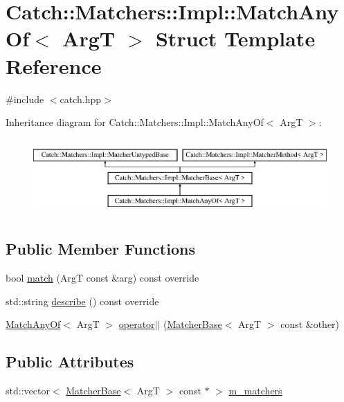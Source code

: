 \hypertarget{struct_catch_1_1_matchers_1_1_impl_1_1_match_any_of}{}\section{Catch\+:\+:Matchers\+:\+:Impl\+:\+:Match\+Any\+Of$<$ ArgT $>$ Struct Template Reference}
\label{struct_catch_1_1_matchers_1_1_impl_1_1_match_any_of}


{\ttfamily \#include $<$catch.\+hpp$>$}

Inheritance diagram for Catch\+:\+:Matchers\+:\+:Impl\+:\+:Match\+Any\+Of$<$ ArgT $>$\+:\begin{figure}[H]
\begin{center}
\leavevmode
\includegraphics[height=2.926829cm]{struct_catch_1_1_matchers_1_1_impl_1_1_match_any_of}
\end{center}
\end{figure}
\subsection*{Public Member Functions}
\begin{DoxyCompactItemize}
\item 
bool \mbox{\hyperlink{struct_catch_1_1_matchers_1_1_impl_1_1_match_any_of_a8a3e8338f979e56277dcf553efb78dc0}{match}} (ArgT const \&arg) const override
\item 
std\+::string \mbox{\hyperlink{struct_catch_1_1_matchers_1_1_impl_1_1_match_any_of_a315285204df93d1f8e72f50dd66eb709}{describe}} () const override
\item 
\mbox{\hyperlink{struct_catch_1_1_matchers_1_1_impl_1_1_match_any_of}{Match\+Any\+Of}}$<$ ArgT $>$ \mbox{\hyperlink{struct_catch_1_1_matchers_1_1_impl_1_1_match_any_of_ab356d77b28b487c2d9fe8b1e1e6f78c9}{operator$\vert$$\vert$}} (\mbox{\hyperlink{struct_catch_1_1_matchers_1_1_impl_1_1_matcher_base}{Matcher\+Base}}$<$ ArgT $>$ const \&other)
\end{DoxyCompactItemize}
\subsection*{Public Attributes}
\begin{DoxyCompactItemize}
\item 
std\+::vector$<$ \mbox{\hyperlink{struct_catch_1_1_matchers_1_1_impl_1_1_matcher_base}{Matcher\+Base}}$<$ ArgT $>$ const  $\ast$ $>$ \mbox{\hyperlink{struct_catch_1_1_matchers_1_1_impl_1_1_match_any_of_a1fb1119e6110dc15b8d5262ec0aeddd5}{m\+\_\+matchers}}
\end{DoxyCompactItemize}
